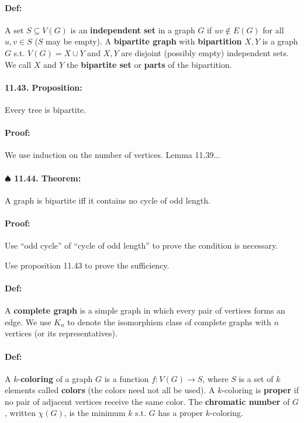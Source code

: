 \documentclass[a4paper, 11pt, twoside]{article}
\begin{document}
\paragraph{Def:} A set $S\subseteq V(G)$ is an \textbf{independent set} in a graph $G$ if $uv\not\in E(G)$ for all $u,v\in S$ ($S$ may be empty). A \textbf{bipartite graph} with \textbf{bipartition} $X, Y$ is a graph $G$ s.t. $V(G)=X\cup Y$ and $X,Y$ are disjoint (possibly empty) independent sets. We call $X$ and $Y$ the \textbf{bipartite set} or \textbf{parts} of the bipartition.

\paragraph{11.43. Proposition:} Every tree is bipartite.

\paragraph{Proof:} We use induction on the number of vertices. Lemma 11.39...

\paragraph{$\spadesuit$ 11.44. Theorem:} A graph is bipartite iff it contains no cycle of odd length.

\paragraph{Proof:} Use ``odd cycle'' of ``cycle of odd length'' to prove the condition is necessary.

Use proposition 11.43 to prove the sufficiency.

\paragraph{Def:} A \textbf{complete graph} is a simple graph in which every pair of vertices forms an edge. We use $K_n$ to denote the isomorphism class of complete graphs with $n$ vertices (or its representatives).

\paragraph{Def:} A $k$-\textbf{coloring} of a graph $G$ is a function $f:V(G)\rightarrow S$, where $S$ is a set of $k$ elements called \textbf{colors} (the colors need not all be used). A $k$-coloring is \textbf{proper} if no pair of adjacent vertices receive the same color. The \textbf{chromatic number} of $G$, written $\chi(G)$, is the minimum $k$ s.t. $G$ has a proper $k$-coloring.
\end{document}
